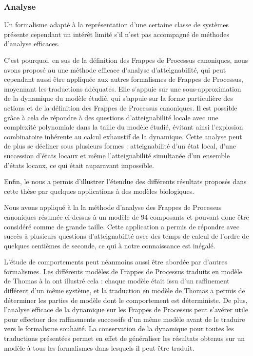 \subsubsection*{Analyse}

Un formalisme adapté à la représentation d'une certaine classe de systèmes présente cependant
un intérêt limité s'il n'est pas accompagné de méthodes d'analyse efficaces.

C'est pourquoi, en sus de la définition des Frappes de Processus canoniques,
nous avons proposé au  une méthode efficace d'analyse d'atteignabilité,
qui peut cependant aussi être appliquée aux autres formalismes
de Frappes de Processus, moyennant les traductions adéquates.
Elle s'appuie sur une sous-approximation de la dynamique du modèle étudié,
qui s'appuie sur la forme particulière des actions et de la définition
des Frappes de Processus canoniques.
Il est possible grâce à cela de répondre à des questions d'atteignabilité locale
avec une complexité polynomiale dans la taille du modèle étudié,
évitant ainsi l'explosion combinatoire inhérente au calcul exhaustif de la dynamique.
Cette analyse peut de plus se décliner sous plusieurs formes :
atteignabilité d'un état local, d'une succession d'états locaux
et même l'atteignabilité simultanée d'un ensemble d'états locaux,
ce qui était auparavant impossible.

\myskip

Enfin, le  nous a permis d'illustrer l'étendue
des différents résultats proposés dans cette thèse
par quelques applications à des modèles biologiques.

Nous avons appliqué à la  la méthode d'analyse des
Frappes de Processus canoniques résumée ci-dessus
à un modèle de 94 composants et pouvant donc être considéré comme de grande taille.
Cette application a permis de répondre avec succès à plusieurs questions d'atteignabilité
avec des temps de calcul de l'ordre de quelques centièmes de seconde,
ce qui à notre connaissance est inégalé.

L'étude de comportements peut néanmoins aussi être abordée par d'autres formalismes.
Les différents modèles de Frappes de Processus traduits en modèle de Thomas
à la  ont illustré cela :
chaque modèle était issu d'un raffinement différent d'un même système,
et la traduction en modèle de Thomas a permis de déterminer
les parties de modèle dont le comportement est déterministe.
De plus, l'analyse efficace de la dynamique sur les Frappes de Processus
peut s'avérer utile pour effectuer des raffinements successifs d'un même modèle
avant de le traduire vers le formalisme souhaité.
La conservation de la dynamique %
pour toutes les traductions présentées
permet en effet de généraliser les résultats obtenus sur un modèle à tous les formalismes
dans lesquels il peut être traduit.

